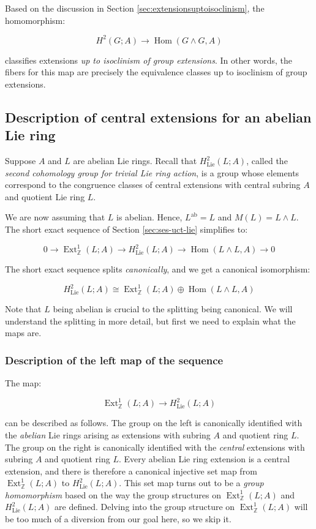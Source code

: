 Based on the discussion in Section \ref{sec:extensionsuptoisoclinism},
the homomorphism:

$$H^2(G;A) \to \operatorname{Hom}(G \wedge G,A)$$

classifies extensions {\em up to isoclinism of group extensions}. In
other words, the fibers for this map are precisely the equivalence
classes up to isoclinism of group extensions.

\subsection{Description of central extensions for an abelian Lie ring}\label{sec:ses-uct-lie-abelian}

Suppose $A$ and $L$ are abelian Lie rings. Recall that
$H^2_{\text{Lie}}(L;A)$, called the {\em second cohomology group for
  trivial Lie ring action}, is a group whose elements correspond to
the congruence classes of central extensions with central subring $A$
and quotient Lie ring $L$.

We are now assuming that $L$ is abelian. Hence, $L^{\operatorname{ab}}
= L$ and $M(L) = L \wedge L$. The short exact sequence of Section
\ref{sec:ses-uct-lie} simplifies to:

\begin{equation}\label{eq:ses-uct-lie-abelian}
0 \to \operatorname{Ext}^1_{\mathbb{Z}}(L;A) \to H^2_{\text{Lie}}(L;A) \to \operatorname{Hom}(L \wedge L, A) \to 0
\end{equation}

The short exact sequence splits {\em canonically}, and we get a
canonical isomorphism:

$$H^2_{\text{Lie}}(L;A) \cong \operatorname{Ext}^1_{\mathbb{Z}}(L;A) \oplus \operatorname{Hom}(L \wedge L,A)$$

Note that $L$ being abelian is crucial to the splitting being
canonical. We will understand the splitting in more detail, but first we need to explain what the maps are.

\subsubsection{Description of the left map of the sequence}\label{sec:ses-uct-lie-abelian-left-map}

The map:

$$\operatorname{Ext}^1_{\mathbb{Z}}(L;A) \to H^2_{\text{Lie}}(L;A)$$

can be described as follows. The group on the left is canonically
identified with the {\em abelian} Lie rings arising as extensions with
subring $A$ and quotient ring $L$. The group on the right is
canonically identified with the {\em central} extensions with subring
$A$ and quotient ring $L$. Every abelian Lie ring extension is a
central extension, and there is therefore a canonical injective set
map from $\operatorname{Ext}^1_{\mathbb{Z}}(L;A)$ to $H^2_{\text{Lie}}(L;A)$. This
set map turns out to be a {\em group homomorphism} based on the way
the group structures on $\operatorname{Ext}^1_{\mathbb{Z}}(L;A)$ and
$H^2_{\text{Lie}}(L;A)$ are defined. Delving into the group structure on
$\operatorname{Ext}^1_{\mathbb{Z}}(L;A)$ will be too much of a
diversion from our goal here, so we skip it.

